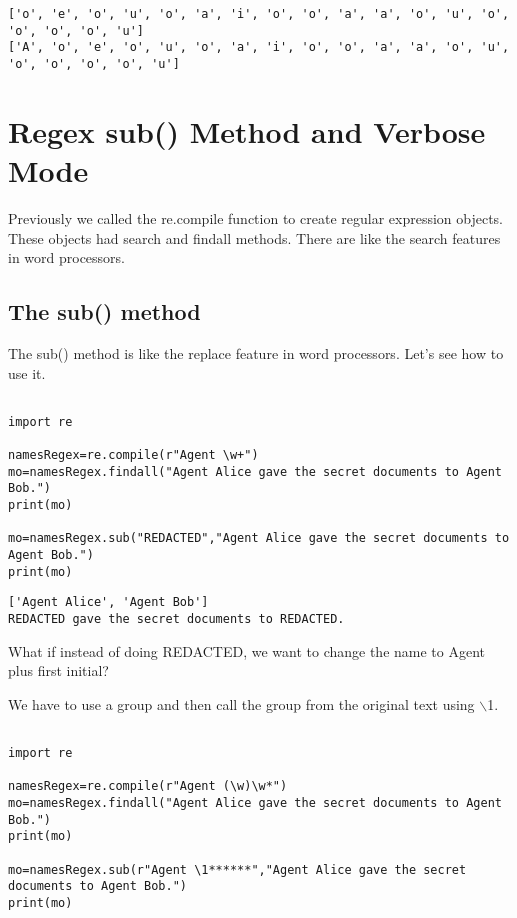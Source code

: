 \documentclass[11pt]{article}
\begin{document}
\begin{verbatim}
['o', 'e', 'o', 'u', 'o', 'a', 'i', 'o', 'o', 'a', 'a', 'o', 'u', 'o', 'o', 'o', 'o', 'u']
['A', 'o', 'e', 'o', 'u', 'o', 'a', 'i', 'o', 'o', 'a', 'a', 'o', 'u', 'o', 'o', 'o', 'o', 'u']
\end{verbatim}

\section{Regex sub() Method and Verbose Mode}
\label{sec:orgeda9acb}

Previously we called the re.compile function to create regular expression objects. These objects had search and findall methods. There are like the search features in word processors.

\subsection{The sub() method}
\label{sec:org64232c6}

The sub() method is like the replace feature in word processors. Let's see how to use it.

\begin{verbatim}

import re

namesRegex=re.compile(r"Agent \w+")
mo=namesRegex.findall("Agent Alice gave the secret documents to Agent Bob.")
print(mo)

mo=namesRegex.sub("REDACTED","Agent Alice gave the secret documents to Agent Bob.")
print(mo)

\end{verbatim}

\begin{verbatim}
['Agent Alice', 'Agent Bob']
REDACTED gave the secret documents to REDACTED.
\end{verbatim}


What if instead of doing REDACTED, we want to change the name to Agent plus first initial?

We have to use a group and then call the group from the original text using $\backslash$1.

\begin{verbatim}

import re

namesRegex=re.compile(r"Agent (\w)\w*")
mo=namesRegex.findall("Agent Alice gave the secret documents to Agent Bob.")
print(mo)

mo=namesRegex.sub(r"Agent \1******","Agent Alice gave the secret documents to Agent Bob.")
print(mo)

\end{verbatim}
\end{document}
